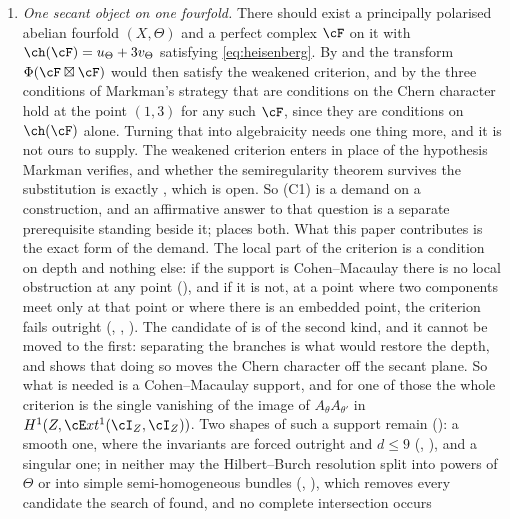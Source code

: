 \begin{enumerate}[label=\textup{(C\arabic*)},leftmargin=3.0em,itemsep=4pt]
\item \emph{One secant object on one fourfold.} There should exist a
  principally polarised abelian fourfold $(X,\Theta)$ and a perfect complex
  $\cF$ on it with $\ch(\cF)=u_{\Theta}+3v_{\Theta}$ satisfying
  \eqref{eq:heisenberg}. By  and 
  the transform $\Phi(\cF\boxtimes\cF)$ would then satisfy the weakened
  criterion, and by  the three conditions of Markman's
  strategy that are conditions on the Chern character hold at the point
  $(1,3)$ for any such $\cF$, since they are conditions on $\ch(\cF)$ alone.
  Turning that into algebraicity needs one thing more, and it is not ours to
  supply. The weakened criterion enters in place of the hypothesis Markman
  verifies, and whether the semiregularity theorem survives the substitution
  is exactly \cite[Question 11.4]{Mar25b}, which is open. So (C1) is a demand
  on a construction, and an affirmative answer to that question is a separate
  prerequisite standing beside it;  places both.
  What this paper contributes is the exact form of the demand. The local part
  of the criterion is a condition on
  depth and nothing else: if the support is Cohen--Macaulay there is no local
  obstruction at any point (), and if it is not, at a
  point where two components meet only at that point or where there is an
  embedded point, the criterion fails outright
  (, ,
  ). The candidate of \cite[Section 12]{Mar25b} is of the
  second kind, and it cannot be moved to the first: separating the branches is
  what would restore the depth, and  shows that doing
  so moves the Chern character off the secant plane. So what is needed is a
  Cohen--Macaulay support, and for one of those the whole criterion is the
  single vanishing of the image of $A_{\theta}A_{\theta'}$ in
  $H^{1}(Z,\cE xt^{1}(\cI_{Z},\cI_{Z}))$. Two shapes of such a support remain
  (): a smooth one, where the invariants are forced
  outright and $d\le9$ (,
  ), and a singular one; in neither may the
  Hilbert--Burch resolution split into powers of $\Theta$ or into simple
  semi-homogeneous bundles (, ), which
  removes every candidate the search of
   found, and no complete intersection occurs

\end{enumerate}
